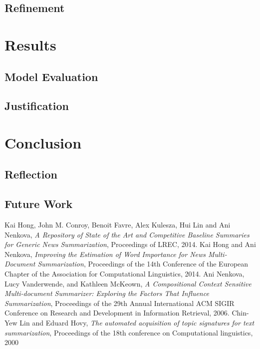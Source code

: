 \documentclass{article}
\begin{document}
\subsection{Refinement}

\section{Results}
\subsection{Model Evaluation}
\subsection{Justification}

\section{Conclusion}
\subsection{Reflection}
\subsection{Future Work}

\newpage
\begin{thebibliography}{99}
    Kai Hong, John M. Conroy, Benoit Favre, Alex Kulesza, Hui Lin and Ani Nenkova,
    \emph{A Repository of State of the Art and Competitive Baseline Summaries for Generic News Summarization},
    Proceedings of LREC, 2014.
    Kai Hong and Ani Nenkova,
    \emph{Improving the Estimation of Word Importance for News Multi-Document Summarization},
    Proceedings of the 14th Conference of the European Chapter of the Association for Computational Linguistics, 2014.
    Ani Nenkova, Lucy Vanderwende, and Kathleen McKeown,
    \emph{A Compositional Context Sensitive Multi-document Summarizer: Exploring the Factors That Influence Summarization},
    Proceedings of the 29th Annual International ACM SIGIR Conference on Research and Development in Information Retrieval, 2006.
    Chin-Yew Lin and Eduard Hovy,
    \emph{The automated acquisition of topic signatures for text summarization},
    Proceedings of the 18th conference on Computational linguistics,
    2000
\end{thebibliography}
\end{document}
